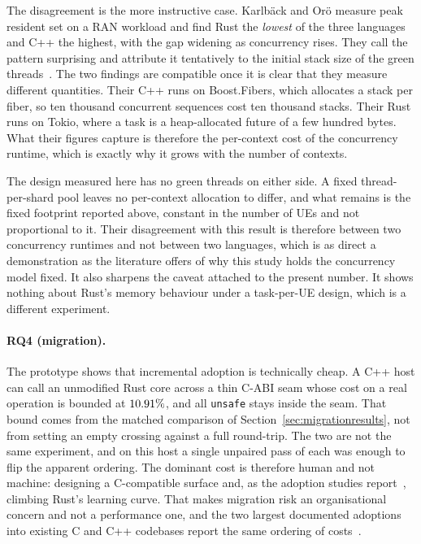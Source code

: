 \documentclass[english,oneside,a4paper,censored,csm,software-track-2020]{HYthesisML}
\begin{document}
The disagreement is the more instructive case. Karlb\"ack and Or\"o measure peak resident set on a RAN workload and
find Rust the \emph{lowest} of the three languages and C++ the highest, with the gap widening
as concurrency rises. They call the pattern surprising and attribute it tentatively to the initial
stack size of the green threads~\cite{karlback2021ran}. The two
findings are compatible once it is clear that they measure different quantities. Their C++ runs
on Boost.Fibers, which allocates a stack per fiber, so ten thousand concurrent sequences cost
ten thousand stacks. Their Rust runs on Tokio, where a task is a heap-allocated future of a few
hundred bytes. What their figures capture is therefore the per-context cost of the concurrency
runtime, which is exactly why it grows with the number of contexts.

The design measured here
has no green threads on either side. A fixed thread-per-shard pool leaves no per-context
allocation to differ, and what remains is the fixed footprint reported above, constant in the
number of UEs and not proportional to it. Their disagreement with this result is therefore
between two concurrency runtimes and not between two languages, which is as direct a
demonstration as the literature offers of why this study holds the concurrency model fixed. It
also sharpens the caveat attached to the present number. It shows nothing about Rust's
memory behaviour under a task-per-UE design, which is a different experiment.

\paragraph{RQ4 (migration).} The prototype shows that incremental adoption is technically
cheap. A C++ host can call an unmodified Rust core across a thin C-ABI seam whose cost on a
real operation is bounded at $10.91\%$, and all \texttt{unsafe} stays inside the seam.
That bound comes from the matched comparison of Section~\ref{sec:migrationresults}, not
from setting an empty crossing
against a full round-trip. The two are not the same experiment, and on this host a single
unpaired pass of each was enough to flip the apparent ordering. The dominant cost is
therefore human and not machine: designing a C-compatible surface and, as the adoption
studies report~\cite{fulton2021adopting,crichton2024learning}, climbing Rust's learning curve.
That makes migration risk an organisational concern and not a performance one, and the two
largest documented adoptions into existing C and C++ codebases report the same ordering of
costs~\cite{li2026rustlinux,fan2026android}.
\end{document}
